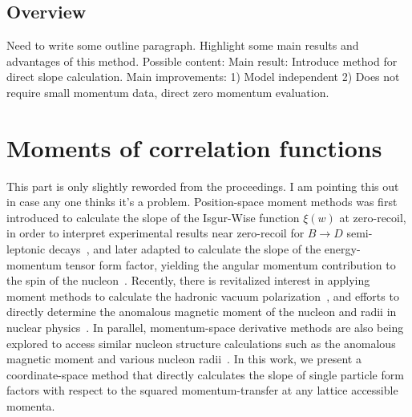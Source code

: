 \documentclass[prd,aps,twocolumn,superscriptaddress,tightenlines,nofootinbib,floatfix,preprintnumbers,10pt]{revtex4-1}
\begin{document}
\subsection{Overview}
{\color{red} Need to write some outline paragraph. Highlight some main results and advantages of this method. Possible content:
 Main result: Introduce method for direct slope calculation. Main improvements: 1) Model independent 2) Does not require small momentum data, direct zero momentum evaluation. 
}

\section{Moments of correlation functions}
{\color{red} This part is only slightly reworded from the proceedings. I am pointing this out in case any one thinks it's a problem.}
Position-space moment methods was first introduced to calculate the slope of the Isgur-Wise function $\xi (w)$ at zero-recoil, in order to interpret experimental results near zero-recoil for $B \rightarrow D$ semi-leptonic decays~\cite{Lellouch:1994zu}, and later adapted to calculate the slope of the energy-momentum tensor form factor, yielding the angular momentum contribution to the spin of the nucleon~\cite{Mathur:1999uf,Gadiyak:2001fe}. Recently, there is revitalized interest in applying moment methods to calculate the hadronic vacuum polarization~\cite{Chakraborty:2016mwy,Blum:2016xpd}, and efforts to directly determine the anomalous magnetic moment of the nucleon and radii in nuclear physics~\cite{Alexandrou:2016rbj}. In parallel, momentum-space derivative methods are also being explored to access similar nucleon structure calculations such as the anomalous magnetic moment and various nucleon radii~\cite{deDivitiis:2012vs,Tiburzi:2014yra}. In this work, we present a coordinate-space method that directly calculates the slope of single particle form factors with respect to the squared momentum-transfer at any lattice accessible momenta.
\end{document}
